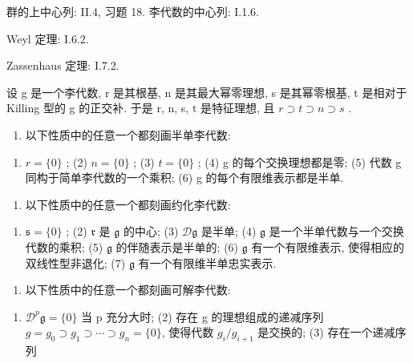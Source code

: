 群的上中心列: II.4, 习题 18. 李代数的中心列: I.1.6.

Weyl 定理: I.6.2.

Zassenhaus 定理: I.7.2.



设 g 是一个李代数, r 是其根基, n 是其最大幂零理想, s 是其幂零根基, t 是相对于 Killing 型的 g 的正交补. 于是 r, n, s, t 是特征理想, 且 \(r \supset t \supset n \supset s\) .

\begin{enumerate}
\def\labelenumi{(\Roman{enumi})}
\tightlist
\item
  以下性质中的任意一个都刻画半单李代数:
\end{enumerate}

\begin{enumerate}
\def\labelenumi{(\arabic{enumi})}
\tightlist
\item
  \(r = \{0\}\) ; (2) \(n = \{0\}\) ; (3) \(t = \{0\}\) ; (4) g 的每个交换理想都是零; (5) 代数 g 同构于简单李代数的一个乘积; (6) g 的每个有限维表示都是半单.
\end{enumerate}

\begin{enumerate}
\def\labelenumi{(\Roman{enumi})}
\setcounter{enumi}{1}
\tightlist
\item
  以下性质中的任意一个都刻画约化李代数:
\end{enumerate}

\begin{enumerate}
\def\labelenumi{(\arabic{enumi})}
\tightlist
\item
  \(\mathfrak{s} = \{0\}\) ; (2) \(\mathfrak{r}\) 是 \(\mathfrak{g}\) 的中心; (3) \(\mathcal{D}\mathfrak{g}\) 是半单; (4) \(\mathfrak{g}\) 是一个半单代数与一个交换代数的乘积; (5) \(\mathfrak{g}\) 的伴随表示是半单的; (6) \(\mathfrak{g}\) 有一个有限维表示, 使得相应的双线性型非退化; (7) \(\mathfrak{g}\) 有一个有限维半单忠实表示.
\end{enumerate}

\begin{enumerate}
\def\labelenumi{(\Roman{enumi})}
\setcounter{enumi}{2}
\tightlist
\item
  以下性质中的任意一个都刻画可解李代数:
\end{enumerate}

\begin{enumerate}
\def\labelenumi{(\arabic{enumi})}
\tightlist
\item
  \(\mathcal{D}^{p}\mathfrak{g} = \{0\}\) 当 p 充分大时; (2) 存在 g 的理想组成的递减序列 \(g = g_{0} \supset g_{1} \supset \cdots \supset g_{n} = \{0\}\), 使得代数 \(g_{i}/g_{i+1}\) 是交换的; (3) 存在一个递减序列
\end{enumerate}


